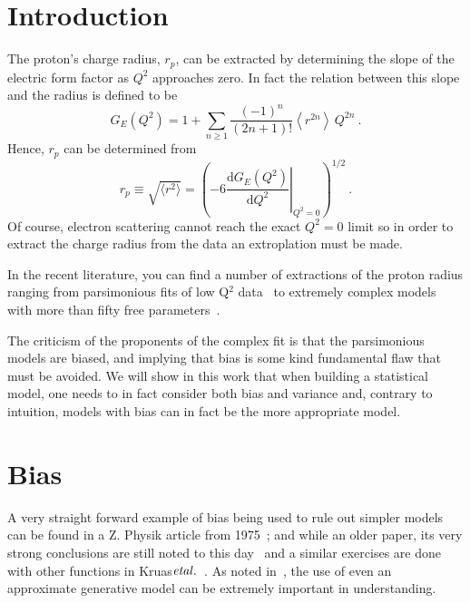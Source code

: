 \documentclass[10pt,aps,prc,twocolumn]{revtex4-1}
\begin{document}
\maketitle

\section{Introduction}

The proton's charge radius, $r_p$, can be extracted
by determining the slope of the electric form factor as $Q^2$
approaches zero.  In fact the relation between this slope and 
the radius is defined to be
$$
G_E(Q^2)
   =  1
   +  \sum_{n\ge 1} \frac{(-1)^n}{(2n+1)!}
      \left\langle r^{2n} \right\rangle \, Q^{2n} \>.
$$
Hence, $r_p$ can be determined from
$$
  r_p \equiv \sqrt{ \langle r^2 \rangle}
   = \left( -6  \left. \frac{\mathrm{d} G_E(Q^2)}{\mathrm{d}Q^2}
    \right|_{Q^{2}=0} \right)^{1/2} \>.
 $$
Of course, electron scattering cannot reach the exact $Q^2 = 0$ limit so 
in order to extract the charge radius from the data an extroplation must
be made.

In the recent literature, you can find a number of extractions of the proton radius ranging from
parsimonious fits of low Q$^2$ data~\cite{Griffioen:2015hta,Horbatsch:2016ilr,Higinbotham:2015rja} to extremely 
complex models with more than fifty free parameters~\cite{}.

The criticism of the proponents of the complex fit is that the parsimonious models are biased, and implying 
that bias is some kind fundamental flaw that must be avoided.    We will show in this work that when building 
a statistical model, one needs to in fact consider both bias and variance and, contrary to intuition, models with 
bias can in fact be the more appropriate model.

\section{Bias}

A very straight forward example of bias being used to rule out simpler models can be found in a Z. Physik
article from 1975~\cite{Borkowski:1975}; and while an older paper, its very strong conclusions are still 
noted to this day~\cite{Sick:2017aor} and a similar exercises are done with other functions in Kruas$\it{et al.}$~\cite{Kraus:2014qua}.
As noted in~\cite{Hogg:2010yz}, the use of even an approximate generative model can be extremely important in understanding. %
\end{document}
